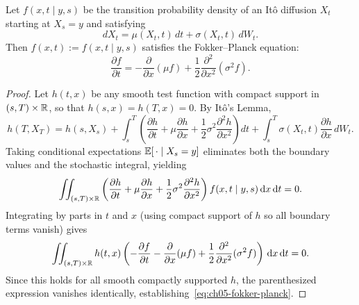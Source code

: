 \begin{lemma}
    \label{lem:ch05-fokker-planck}
    Let $f(x, t \mid y, s)$ be the transition probability density of an It\^o diffusion $X_t$ starting at $X_s = y$ and satisfying
    \[
        dX_t = \mu(X_t, t)\,dt + \sigma(X_t, t)\,dW_t.
    \]
    Then $f(x, t) := f(x, t \mid y, s)$ satisfies the Fokker--Planck equation:
    \begin{equation}
        \label{eq:ch05-fokker-planck}
        \frac{\partial f}{\partial t} = -\frac{\partial}{\partial x}(\mu f) + \frac{1}{2}\frac{\partial^2}{\partial x^2}(\sigma^2 f).
    \end{equation}
\end{lemma}
\begin{proof}
    Let $h(t, x)$ be any smooth test function with compact support in $(s, T) \times \mathbb{R}$, so that $h(s, x) = h(T, x) = 0$. By It\^o's Lemma,
    \[
        h(T, X_T) = h(s, X_s)
        + \int_s^T \left(\frac{\partial h}{\partial t} + \mu\frac{\partial h}{\partial x} + \frac{1}{2}\sigma^2\frac{\partial^2 h}{\partial x^2}\right)dt
        + \int_s^T \sigma(X_t, t)\frac{\partial h}{\partial x}\,dW_t.
    \]
    Taking conditional expectations $\mathbb{E}[\,\cdot \mid X_s = y]$ eliminates both the boundary values and the stochastic integral, yielding
    \[
        \iint_{(s, T) \times \mathbb{R}} \left(\frac{\partial h}{\partial t} + \mu\frac{\partial h}{\partial x} + \frac{1}{2}\sigma^2\frac{\partial^2 h}{\partial x^2}\right) f(x, t \mid y, s)\,\mathrm{d} x\,\mathrm{d} t = 0.
    \]
    Integrating by parts in $t$ and $x$ (using compact support of $h$ so all boundary terms vanish) gives
    \[
        \iint_{(s, T) \times \mathbb{R}} h(t, x)\left(-\frac{\partial f}{\partial t} - \frac{\partial}{\partial x}(\mu f) + \frac{1}{2}\frac{\partial^2}{\partial x^2}(\sigma^2 f)\right)\,\mathrm{d} x\,\mathrm{d} t = 0.
    \]
    Since this holds for all smooth compactly supported $h$, the parenthesized expression vanishes identically, establishing~\eqref{eq:ch05-fokker-planck}.
\end{proof}

